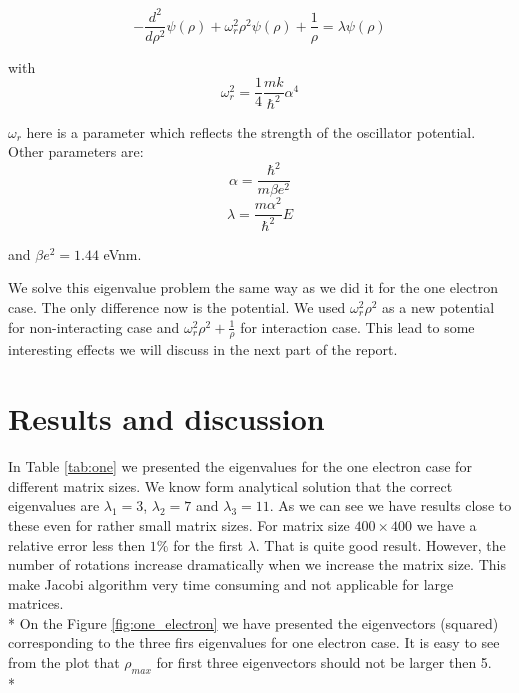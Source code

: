 \documentclass[10pt]{article}
\begin{document}
	\begin{equation}
		-\frac{d^{2}}{d\rho ^{2}}\psi (\rho )+\omega _{r}^{2}\rho ^{2}\psi (\rho )+%
		\frac{1}{\rho }=\lambda \psi (\rho )
	\end{equation}
	
	with 
	\begin{equation}
		\omega _{r}^{2}=\frac{1}{4}\frac{mk}{\hbar ^{2}}\alpha ^{4}
	\end{equation}
	
	$\omega _{r}$ here is a parameter which reflects the strength of the
	oscillator potential. Other parameters are:%
	\begin{equation}
		\alpha =\frac{\hbar ^{2}}{m\beta e^{2}}
	\end{equation}%
	\begin{equation}
		\lambda =\frac{m\alpha ^{2}}{\hbar ^{2}}E
	\end{equation}
	
	and $\beta e^{2}=1.44$ eVnm.
	
We solve this eigenvalue problem the same way as we did it for the one
electron case. The only difference now is the potential. We used $\omega _{r}^{2}\rho ^{2} $ as a new potential for non-interacting case and  $\omega _{r}^{2}\rho ^{2}+\frac{1}{\rho }$ for interaction case. This lead to some interesting effects we will discuss in the next part of the report.

\newpage
\section{Results and discussion}\label{results}
In Table \ref{tab:one} we presented the eigenvalues for the one electron case for different matrix sizes. We know form analytical solution that the correct eigenvalues are $ \lambda_{1}=3 $, $ \lambda_{2}=7 $ and $ \lambda_{3}=11 $. As we can see we have results close to these even for rather small matrix sizes. For matrix size $ 400 \times 400 $ we have a relative error less then $ 1\% $ for the first $ \lambda $. That is quite good result. However, the number of rotations increase dramatically when we increase the matrix size. This make Jacobi algorithm very time consuming and not applicable for large matrices. \\*
On the Figure \ref{fig:one_electron} we have presented the eigenvectors (squared) corresponding to the three firs eigenvalues for one electron case. It is easy to see from the plot that $\rho_{max}$ for first three eigenvectors should not be larger then 5. \\*
\end{document}
